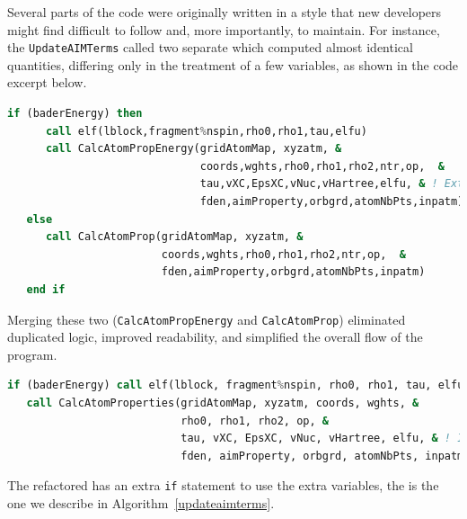 Several parts of the code were originally written in a style that new
developers might find difficult to follow and, more importantly, to maintain.
For instance, the \subroutine \texttt{UpdateAIMTerms} called two separate
\subroutines which computed almost identical quantities, differing only in the
treatment of a few variables, as shown in the code excerpt below.

\begin{lstlisting}[language=Fortran, style=mystyle]
   if (baderEnergy) then 
      call elf(lblock,fragment%nspin,rho0,rho1,tau,elfu) 
      call CalcAtomPropEnergy(gridAtomMap, xyzatm, & 
                              coords,wghts,rho0,rho1,rho2,ntr,op,  &  
                              tau,vXC,EpsXC,vNuc,vHartree,elfu, & ! Extra variables
                              fden,aimProperty,orbgrd,atomNbPts,inpatm) 
   else 
      call CalcAtomProp(gridAtomMap, xyzatm, & 
                        coords,wghts,rho0,rho1,rho2,ntr,op,  & 
                        fden,aimProperty,orbgrd,atomNbPts,inpatm)
   end if
\end{lstlisting}

Merging these two \subroutines (\texttt{CalcAtomPropEnergy} and
\texttt{CalcAtomProp}) eliminated duplicated logic, improved readability, and
simplified the overall flow of the program.

\begin{lstlisting}[language=Fortran, style=mystyle]
   if (baderEnergy) call elf(lblock, fragment%nspin, rho0, rho1, tau, elfu)
   call CalcAtomProperties(gridAtomMap, xyzatm, coords, wghts, &
                           rho0, rho1, rho2, op, &
                           tau, vXC, EpsXC, vNuc, vHartree, elfu, & ! Ignore if not needed
                           fden, aimProperty, orbgrd, atomNbPts, inpatm) 
\end{lstlisting}

The refactored \subroutine has an extra \texttt{if} statement to use the extra
variables, the \subroutine is the one we describe in
Algorithm~\ref{updateaimterms}.


